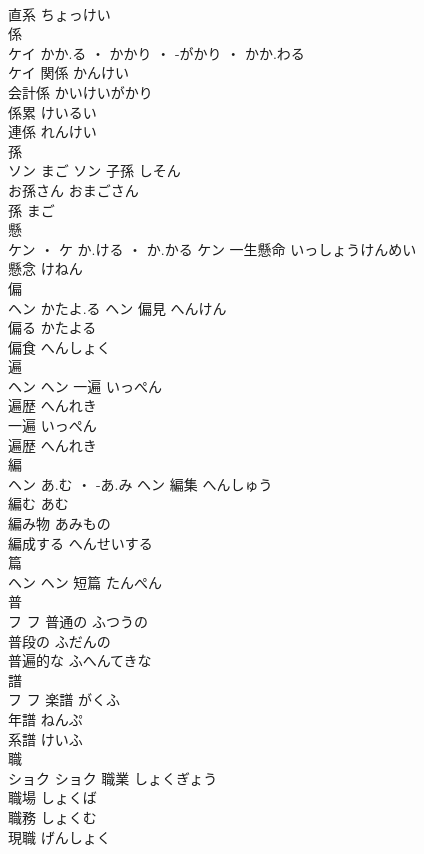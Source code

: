 \documentclass[8pt]{extreport}
\begin{document}
\begin{CJK}{UTF8}{min}
\\	直系	ちょっけい	
\\	係	
\\	ケイ	かか.る ・ かかり ・ -がかり ・ かか.わる
\\	ケイ	関係	かんけい	
\\	会計係	かいけいがかり	
\\	係累	けいるい	
\\	連係	れんけい	
\\	孫	
\\	ソン	まご	ソン	子孫	しそん	
\\	お孫さん	おまごさん	
\\	孫	まご	
\\	懸	
\\	ケン ・ ケ	か.ける ・ か.かる	ケン	一生懸命	いっしょうけんめい	
\\	懸念	けねん	
\\	偏	
\\	ヘン	かたよ.る	ヘン	偏見	へんけん	
\\	偏る	かたよる	
\\	偏食	へんしょく	
\\	遍	
\\	ヘン		ヘン	一遍	いっぺん	
\\	遍歴	へんれき	
\\	一遍	いっぺん	
\\	遍歴	へんれき	
\\	編	
\\	ヘン	あ.む ・ -あ.み	ヘン	編集	へんしゅう	
\\	編む	あむ	
\\	編み物	あみもの	
\\	編成する	へんせいする	
\\	篇	
\\	ヘン		ヘン													短篇	たんぺん	
\\	普	
\\	フ		フ	普通の	ふつうの	
\\	普段の	ふだんの	
\\	普遍的な	ふへんてきな	
\\	譜	
\\	フ		フ	楽譜	がくふ	
\\	年譜	ねんぷ	
\\	系譜	けいふ	
\\	職	
\\	ショク		ショク	職業	しょくぎょう	
\\	職場	しょくば	
\\	職務	しょくむ	
\\	現職	げんしょく	

\end{CJK}
\end{document}
